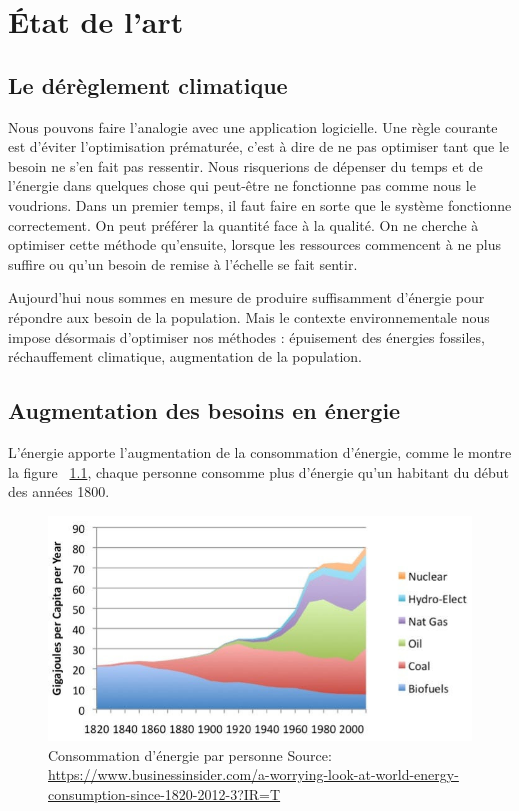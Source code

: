 \chapter{État de l’art}

\section{Le dérèglement climatique}

Nous pouvons faire l’analogie avec une application logicielle. Une règle courante est d’éviter
l’optimisation prématurée, c’est à dire de ne pas optimiser tant que le besoin ne s’en fait pas
ressentir. Nous risquerions de dépenser du temps et de l'énergie dans quelques chose qui
peut-être ne fonctionne pas comme nous le voudrions.
Dans un premier temps, il faut faire en sorte que le système fonctionne correctement.
On peut préférer la quantité face à la qualité. On ne cherche à optimiser cette méthode
qu’ensuite, lorsque les ressources commencent à ne plus suffire ou qu’un besoin de remise
à l’échelle se fait sentir.

Aujourd'hui nous sommes en mesure de produire suffisamment d’énergie pour répondre aux
besoin de la population. Mais le contexte environnementale nous impose désormais d’optimiser
nos méthodes : épuisement des énergies fossiles, réchauffement climatique, augmentation de la
population.

\section{Augmentation des besoins en énergie}

L'énergie apporte l'augmentation de la consommation d'énergie, comme le montre la figure
~\ref{fig:capita_energy}, chaque personne consomme plus d'énergie qu'un habitant
du début des années 1800.

\begin{figure}
  \centering
  \includegraphics[scale=0.35]{media/world_per_capita_energy.jpeg}
  \caption{
      Consommation d'énergie par personne\newline
      \tiny{Source:\newline
        \url{https://www.businessinsider.com/a-worrying-look-at-world-energy-consumption-since-1820-2012-3?IR=T}
      }
  }
  \label{fig:capita_energy}
\end{figure}

